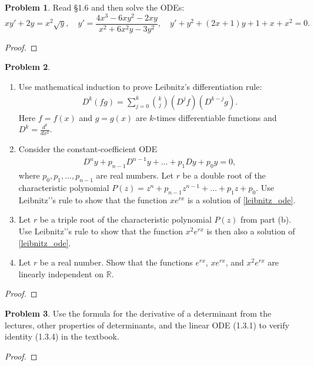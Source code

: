 \documentclass[12pt]{article}
\theoremstyle{definition}
\newtheorem{problem}{Problem}
\begin{document}
\begin{problem}
  Read \S1.6 and then solve the ODEs:
  $$xy' + 2y = x^2\sqrt{y}, \quad y' = \frac{4x^3-6xy^2-2xy}{x^2+6x^2y-3y^2}, \quad y' + y^2 +(2x+1)y + 1 + x + x^2 = 0.$$
\end{problem}

\begin{proof}
\end{proof}
\newpage


\begin{problem}
  \begin{enumerate}
    \item Use mathematical induction to prove Leibnitz's differentiation rule:
      \begin{align*}
        D^{k}(fg) = \sum_{j=0}^k \binom{k}{j}(D^j f) (D^{k-j}g).
      \end{align*}
      Here $f = f(x)$ and $g=g(x)$ are $k$-times differentiable functions and $D^k = \frac{d^k}{dx^k}$.
    \item Consider the constant-coefficient ODE
      \begin{align}\label{leibnitz_ode}
        D^n y + p_{n-1}D^{n-1}y + \dots + p_1 Dy + p_0 y = 0,
      \end{align}
      where $p_0, p_1, \dots, p_{n-1}$ are real numbers. Let $r$ be a double root of the characteristic polynomial
      $P(z) = z^n + p_{n-1} z^{n-1} + \dots + p_1 z + p_0.$ Use Leibnitz’'s rule to
      show that the function $xe^{rx}$ is a solution of \eqref{leibnitz_ode}.
    \item Let $r$ be a triple root of the characteristic polynomial $P(z)$ from part (b).
      Use Leibnitz'’s rule to show that the function $x^2 e^{rx}$
      is then also a solution of \eqref{leibnitz_ode}.
    \item Let $r$ be a real number. Show that the functions $e^{rx}$, $xe^{rx}$, and $x^2 e^{rx}$
      are linearly independent on $\mathbb{R}$.
  \end{enumerate}
\end{problem}

\begin{proof}
\end{proof}
\newpage


\begin{problem}
  Use the formula for the derivative of a determinant from the lectures, other
  properties of determinants, and the linear ODE (1.3.1) to verify identity
  (1.3.4) in the textbook.
\end{problem}

\begin{proof}
\end{proof}
\end{document}
